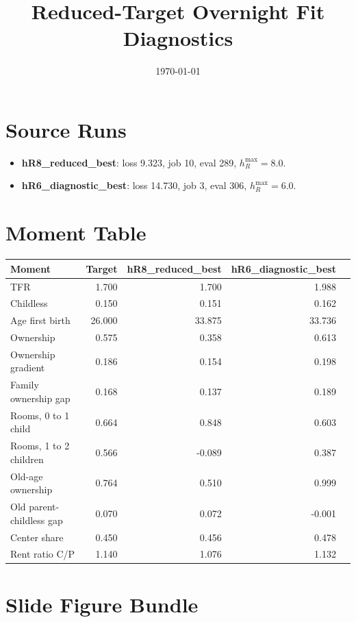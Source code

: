 \documentclass[11pt]{article}
\title{Reduced-Target Overnight Fit Diagnostics}
\date{\today}
\begin{document}
\maketitle
\section*{Source Runs}
\begin{itemize}
\item \textbf{hR8\_reduced\_best}: loss 9.323, job 10, eval 289, $h_R^{\max}=8.0$.
\item \textbf{hR6\_diagnostic\_best}: loss 14.730, job 3, eval 306, $h_R^{\max}=6.0$.
\end{itemize}
\section*{Moment Table}
\begin{table}[H]\centering\small
\begin{tabular}{lrrrr}
\toprule
Moment & Target & hR8\_reduced\_best & hR6\_diagnostic\_best \\
\midrule
TFR & 1.700 & 1.700 & 1.988 \\
Childless & 0.150 & 0.151 & 0.162 \\
Age first birth & 26.000 & 33.875 & 33.736 \\
Ownership & 0.575 & 0.358 & 0.613 \\
Ownership gradient & 0.186 & 0.154 & 0.198 \\
Family ownership gap & 0.168 & 0.137 & 0.189 \\
Rooms, 0 to 1 child & 0.664 & 0.848 & 0.603 \\
Rooms, 1 to 2 children & 0.566 & -0.089 & 0.387 \\
Old-age ownership & 0.764 & 0.510 & 0.999 \\
Old parent-childless gap & 0.070 & 0.072 & -0.001 \\
Center share & 0.450 & 0.456 & 0.478 \\
Rent ratio C/P & 1.140 & 1.076 & 1.132 \\
\bottomrule
\end{tabular}
\end{table}
\section*{Slide Figure Bundle}
\end{document}

